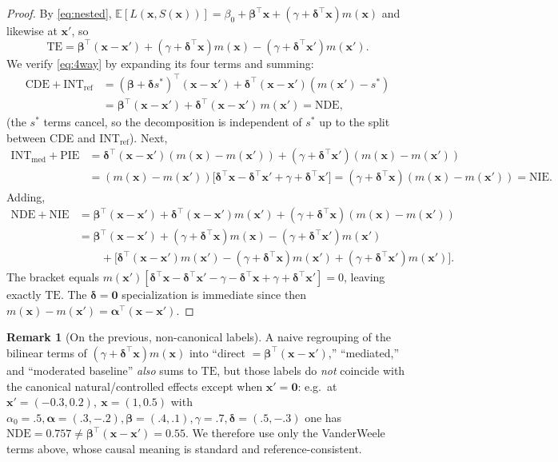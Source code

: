\documentclass{amsart}
\theoremstyle{definition}
\newtheorem{remark}{Remark}
\theoremstyle{plain}
\begin{document}
\begin{proof}
By \eqref{eq:nested}, $\mathbb E[L(\bm x,S(\bm x))]
=\beta_0+\bm\beta^\top\bm x+(\gamma+\bm\delta^\top\bm x)m(\bm x)$ and likewise at
$\bm x'$, so
\[
\mathrm{TE}=\bm\beta^\top(\bm x-\bm x')
+(\gamma+\bm\delta^\top\bm x)m(\bm x)-(\gamma+\bm\delta^\top\bm x')m(\bm x').
\]
We verify \eqref{eq:4way} by expanding its four terms and summing:
\begin{align*}
\mathrm{CDE}+\mathrm{INT_{ref}}
&=(\bm\beta+\bm\delta s^\ast)^\top(\bm x-\bm x')
  +\bm\delta^\top(\bm x-\bm x')(m(\bm x')-s^\ast)\\
&=\bm\beta^\top(\bm x-\bm x')+\bm\delta^\top(\bm x-\bm x')\,m(\bm x')
  =\mathrm{NDE},
\end{align*}
(the $s^\ast$ terms cancel, so the decomposition is independent of $s^\ast$ up to the split
between CDE and INT$_{\mathrm{ref}}$). Next,
\begin{align*}
\mathrm{INT_{med}}+\mathrm{PIE}
&=\bm\delta^\top(\bm x-\bm x')(m(\bm x)-m(\bm x'))
  +(\gamma+\bm\delta^\top\bm x')(m(\bm x)-m(\bm x'))\\
&=(m(\bm x)-m(\bm x'))\big[\bm\delta^\top\bm x-\bm\delta^\top\bm x'+\gamma+\bm\delta^\top\bm
x'\big]
=(\gamma+\bm\delta^\top\bm x)(m(\bm x)-m(\bm x'))=\mathrm{NIE}.
\end{align*}
Adding,
\begin{align*}
\mathrm{NDE}+\mathrm{NIE}
&=\bm\beta^\top(\bm x-\bm x')+\bm\delta^\top(\bm x-\bm x')m(\bm x')
  +(\gamma+\bm\delta^\top\bm x)(m(\bm x)-m(\bm x'))\\
&=\bm\beta^\top(\bm x-\bm x')+(\gamma+\bm\delta^\top\bm x)m(\bm x)
  -(\gamma+\bm\delta^\top\bm x')m(\bm x')\\
&\qquad+\big[\bm\delta^\top(\bm x-\bm x')m(\bm x')-(\gamma+\bm\delta^\top\bm x)m(\bm x')
  +(\gamma+\bm\delta^\top\bm x')m(\bm x')\big].
\end{align*}
The bracket equals $m(\bm x')[\bm\delta^\top\bm x-\bm\delta^\top\bm x'-\gamma-\bm\delta^\top
\bm x+\gamma+\bm\delta^\top\bm x']=0$, leaving exactly $\mathrm{TE}$. The $\bm\delta=\bm0$
specialization is immediate since then $m(\bm x)-m(\bm x')=\bm\alpha^\top(\bm x-\bm x')$.
\end{proof}

\begin{remark}[On the previous, non-canonical labels]
A naive regrouping of the bilinear terms of $(\gamma+\bm\delta^\top\bm x)m(\bm x)$ into
``direct $=\bm\beta^\top(\bm x-\bm x')$,'' ``mediated,'' and ``moderated baseline''
\emph{also} sums to $\mathrm{TE}$, but those labels do \emph{not} coincide with the
canonical natural/controlled effects except when $\bm x'=\bm0$: e.g.\ at $\bm
x'=(-0.3,0.2),\ \bm x=(1,0.5)$ with $\alpha_0=.5,\bm\alpha=(.3,-.2),\bm\beta=(.4,.1),
\gamma=.7,\bm\delta=(.5,-.3)$ one has $\mathrm{NDE}=0.757\neq\bm\beta^\top(\bm x-\bm x')=
0.55$. We therefore use only the VanderWeele terms above, whose causal meaning is standard
and reference-consistent.
\end{remark}
\end{document}
